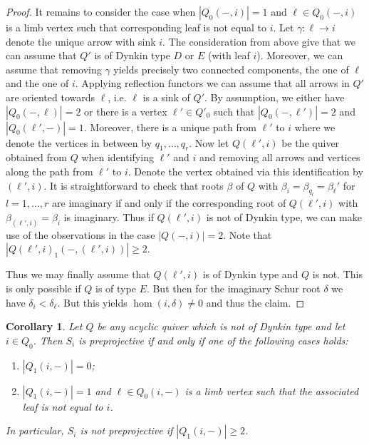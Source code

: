 \documentclass{amsart}
\newtheorem{corollary}[theorem]{Corollary}
\numberwithin{equation}{section}
\newcommand\udim{{\underline{\dim}\, }}
\newcommand{\Hom}{\operatorname{Hom}}
\begin{document}
\begin{proof}
	It remains to consider the case when $|Q_0(-,i)|=1$ and $\ell\in Q_0(-,i)$ is a limb vertex such that corresponding leaf is not equal to $i$. Let $\gamma:\ell\to i$ denote the unique arrow with sink $i$. 
The consideration from above give that we can assume that $Q'$ is of Dynkin type $D$ or $E$ (with leaf $i$). Moreover, we can assume that removing $\gamma$ yields precisely two connected components, the one of $\ell$ and the one of $i$. Applying reflection functors we can assume that all arrows in $Q'$ are oriented towards $\ell$, i.e. $\ell$ is a sink of $Q'$. By assumption, we either have $|Q_0(-,\ell)|=2$ or there is a vertex $\ell'\in Q'_0$ such that $|Q_0(-,\ell')|=2$ and $|Q_0(\ell',-)|=1$. Moreover, there is a unique path from $\ell'$ to $i$ where we denote the vertices in between by $q_1,\ldots,q_r$. Now let $Q(\ell',i)$ be the quiver obtained from $Q$ when identifying $\ell'$ and $i$ and removing all arrows and vertices along the path from $\ell'$ to $i$. Denote the vertex obtained via this identification by $(\ell',i)$. It is straightforward to check that roots $\beta$ of $Q$ with $\beta_i=\beta_{q_l}=\beta_\ell'$ for $l=1,\ldots,r$ are imaginary if and only if the corresponding root of $Q(\ell',i)$ with $\beta_{(\ell',i)}=\beta_i$ is imaginary. Thus if $Q(\ell',i)$ is not of Dynkin type, we can make use of the observations in the case $|Q(-,i)|=2$. Note that $|Q(\ell',i)_1(-,(\ell',i))|\geq 2$.

 Thus we may finally assume that $Q(\ell',i)$ is of Dynkin type and $Q$ is not. This is only possible if $Q$ is of type $E$. But then for the imaginary Schur root $\delta$ we have $\delta_i<\delta_\ell$. But this yields $\hom(i,\delta)\neq 0$ and thus the claim.


  
	 

\end{proof}

\begin{corollary}
  \label{pro:simpleregular2}
  Let $Q$ be any acyclic quiver which is not of Dynkin type and let $i\in Q_0$. Then $S_i$ is preprojective if and only if one of the following cases holds: 
  \begin{enumerate}
    \item $|Q_1(i,-)|=0$;
    \item $|Q_1(i,-)|=1$ and $\ell\in Q_0(i,-)$ is a limb vertex such that the associated leaf is not equal to $i$.
		\end{enumerate}
In particular, $S_i$ is not preprojective if $|Q_1(i,-)|\geq 2$.
			

\end{corollary}
\end{document}
